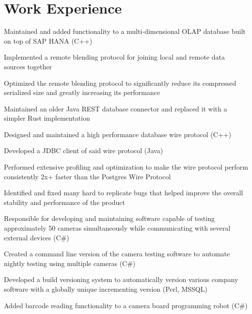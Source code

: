 \documentclass[]{deedy-resume-openfont}
\begin{document}
%
%
%
%
\section{Work Experience}
\hfill {}
\begin{tightemize}
	\item Maintained and added functionality to a multi-dimensional OLAP database built on top of SAP HANA (C++)
	\item Implemented a remote blending protocol for joining local and remote data sources together
	\item Optimized the remote blending protocol to significantly reduce its compressed serialized size and greatly increasing its performance
	\item Maintained an older Java REST database connector and replaced it with a simpler Rust implementation
\end{tightemize}
\sectionsep
{}\hfill {}
\begin{tightemize}
	\item Designed and maintained a high performance database wire protocol (C++)
	\item Developed a JDBC client of said wire protocol (Java)
	\item Performed extensive profiling and optimization to make the wire protocol perform consistently 2x+ faster than the Postgres Wire Protocol
	\item Identified and fixed many hard to replicate bugs that helped improve the overall stability and performance of the product
\end{tightemize}
\sectionsep
{}\hfill {}
\begin{tightemize}
	\item Responsible for developing and maintaining software capable of testing approximately 50 cameras simultaneously while communicating with several external devices (C\#)
	\item Created a command line version of the camera testing software to automate nightly testing using multiple cameras (C\#)
	\item Developed a build versioning system to automatically version various company software with a globally unique incrementing version (Perl, MSSQL)
	\item Added barcode reading functionality to a camera board programming robot (C\#)
\end{tightemize}
\sectionsep
%
%
\end{document}
